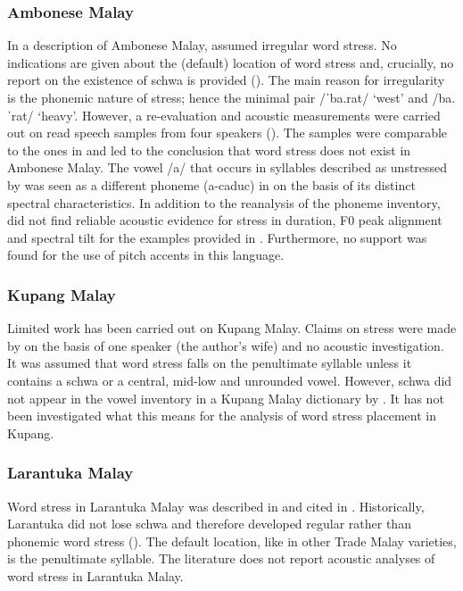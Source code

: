 \subsubsection{Ambonese Malay}
In a description of Ambonese Malay, \citet{vanminde_malayu_1997} assumed irregular word stress. No indications are given about the (default) location of word stress and, crucially, no report on the existence of schwa is provided (\citealt{paauw_malay_2009}). The main reason for irregularity is the phonemic nature of stress; hence the minimal pair /ˈba.rat/ `west' and /ba.ˈrat/ `heavy'. However, a re-evaluation and acoustic measurements were carried out on read speech samples from four speakers (\citealt{maskikit-essed_no_2016}). The samples were comparable to the ones in \citet{vanminde_malayu_1997} and led to the conclusion that word stress does not exist in Ambonese Malay. The vowel /a/ that occurs in syllables described as unstressed by \citet{vanminde_malayu_1997} was seen as a different phoneme (a-caduc) in \citet{maskikit-essed_no_2016} on the basis of its distinct spectral characteristics. In addition to the reanalysis of the phoneme inventory, \citet{maskikit-essed_no_2016} did not find reliable acoustic evidence for stress in duration, F0 peak alignment and spectral tilt for the examples provided in \citet{vanminde_malayu_1997}. Furthermore, no support was found for the use of pitch accents in this language.

\subsubsection{Kupang Malay}
Limited work has been carried out on Kupang Malay. Claims on stress were made by \citet{steinhauer_notes_1983} on the basis of one speaker (the author's wife) and no acoustic investigation. It was assumed that word stress falls on the penultimate syllable unless it contains a schwa or a central, mid-low and unrounded vowel. However, schwa did not appear in the vowel inventory in a Kupang Malay dictionary by \citet{jacob_kamus_2003}. It has not been investigated what this means for the analysis of word stress placement in Kupang.

\subsubsection{Larantuka Malay}
Word stress in Larantuka Malay was described in \citet{kumanireng_struktur_1993} and cited in \citet{paauw_malay_2009}. Historically, Larantuka did not lose schwa and therefore developed regular rather than phonemic word stress (\citealt{paauw_malay_2009}). The default location, like in other Trade Malay varieties, is the penultimate syllable. The literature does not report acoustic analyses of word stress in Larantuka Malay.

